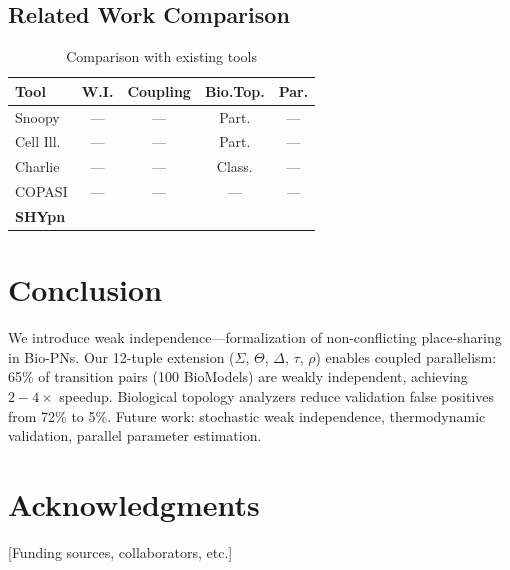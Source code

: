 \documentclass[twocolumn,11pt]{article}
\newcommand{\cmark}{\ding{51}}  %
\begin{document}
\subsection{Related Work Comparison}

\begin{table}[htbp]
\small
\caption{Comparison with existing tools}
\label{tab:comparison}
\vspace{-6pt}
\begin{tabular*}{\columnwidth}{@{\extracolsep{\fill}}lcccc@{}}
\toprule
\textbf{Tool} & \textbf{W.I.} & \textbf{Coupling} & \textbf{Bio.Top.} & \textbf{Par.} \\
\midrule
Snoopy & --- & --- & Part. & --- \\
Cell Ill. & --- & --- & Part. & --- \\
Charlie & --- & --- & Class. & --- \\
COPASI & --- & --- & --- & --- \\
\textbf{SHYpn} & \textbf{\cmark} & \textbf{\cmark} & \textbf{\cmark} & \textbf{\cmark} \\
\bottomrule
\end{tabular*}
\vspace{-8pt}
\end{table}

\section{Conclusion}

We introduce weak independence---formalization of non-conflicting place-sharing in Bio-PNs. Our 12-tuple extension ($\Sigma$, $\Theta$, $\Delta$, $\tau$, $\rho$) enables coupled parallelism: 65\% of transition pairs (100 BioModels) are weakly independent, achieving $2{-}4\times$ speedup. Biological topology analyzers reduce validation false positives from 72\% to 5\%. Future work: stochastic weak independence, thermodynamic validation, parallel parameter estimation.

\section*{Acknowledgments}
[Funding sources, collaborators, etc.]



\end{document}
